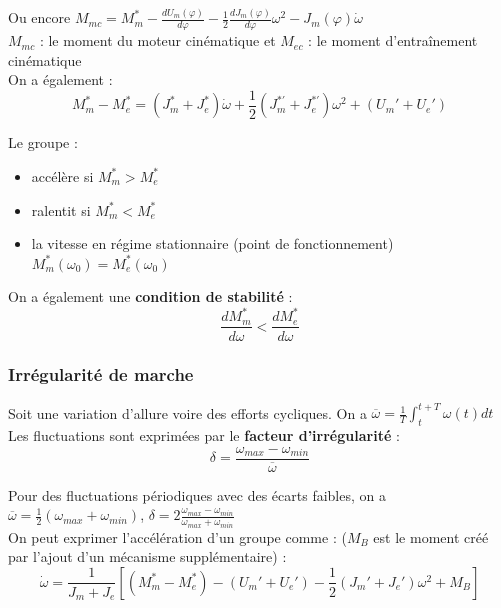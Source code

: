 \documentclass[../main.tex]{subfiles}
\begin{document}
Ou encore $M_{mc} = M_m^* - \frac{dU_m (\varphi)}{d\varphi} - \frac{1}{2} \frac{d J_m (\varphi)}{d\varphi} \omega^2 - J_m (\varphi) \dot{\omega}$\\

$M_{mc}$ : le moment du moteur cinématique et $M_{ec}$ : le moment d'entraînement cinématique\\

On a également : \begin{equation}
    M_m^* - M_e^* = (J_m^* + J_e^*) \dot{\omega} + \frac{1}{2} (J_m^{*'} + J_e^{*'})\omega^2 + (U_m' + U_e')
\end{equation}

Le groupe : 
\begin{itemize}
    \item accélère si $M_m^* > M_e^*$\\
    \item ralentit si $M_m^* < M_e^*$\\
    \item la vitesse en régime stationnaire (point de fonctionnement) $M_m^*(\omega_0) = M_e^*(\omega_0)$\\
\end{itemize}

On a également une \textbf{condition de stabilité} : \begin{equation}
    \frac{d M_m^*}{d\omega} < \frac{d M_e^*}{d\omega}
\end{equation}

\subsubsection{Irrégularité de marche}
Soit une variation d'allure voire des efforts cycliques. On a $\overline{\omega} = \frac{1}{T} \int_t^{t+T} \omega(t) dt$\\

Les fluctuations sont exprimées par le \textbf{facteur d'irrégularité} : \begin{equation}
    \delta = \frac{\omega_{max}-\omega_{min}}{\overline{\omega}}
\end{equation}

Pour des fluctuations périodiques avec des écarts faibles, on a $\overline{\omega} = \frac{1}{2}(\omega_{max} + \omega_{min})$, $\delta = 2 \frac{\omega_{max} - \omega_{min}}{\omega_{max} + \omega_{min}}$\\

On peut exprimer l'accélération d'un groupe comme : ($M_B$ est le moment créé par l'ajout d'un mécanisme supplémentaire) : \begin{equation}
    \dot{\omega} = \frac{1}{J_m + J_e} [(M_m^* - M_e^*) - (U_m' + U_e') - \frac{1}{2} (J_m' + J_e')\omega^2 + M_B]
\end{equation}
\end{document}
